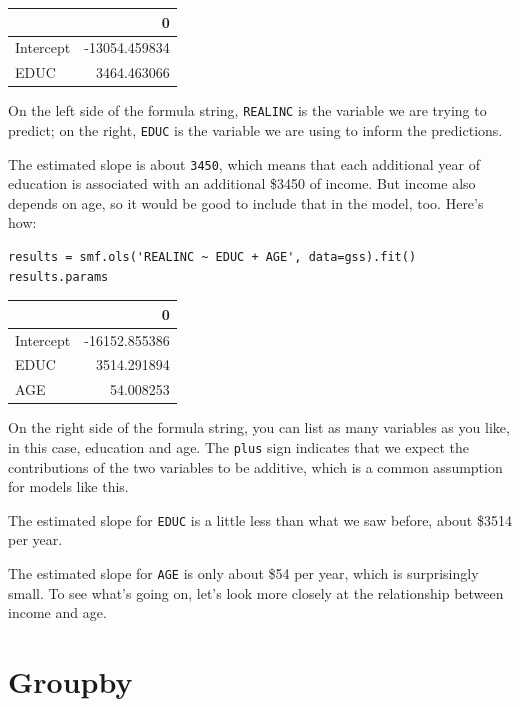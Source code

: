 \begin{tabular}{lr}
\midrule
{} &             0 \\
\midrule
Intercept & -13054.459834 \\
EDUC      &   3464.463066 \\
\midrule
\end{tabular}

On the left side of the formula string,
\passthrough{\lstinline!REALINC!} is the variable we are trying to
predict; on the right, \passthrough{\lstinline!EDUC!} is the variable we
are using to inform the predictions.

The estimated slope is about \passthrough{\lstinline!3450!}, which means
that each additional year of education is associated with an additional
\$3450 of income. But income also depends on age, so it would be good to
include that in the model, too. Here's how:

\begin{lstlisting}[]
results = smf.ols('REALINC ~ EDUC + AGE', data=gss).fit()
results.params
\end{lstlisting}

\begin{tabular}{lr}
\midrule
{} &             0 \\
\midrule
Intercept & -16152.855386 \\
EDUC      &   3514.291894 \\
AGE       &     54.008253 \\
\midrule
\end{tabular}

On the right side of the formula string, you can list as many variables
as you like, in this case, education and age. The
\passthrough{\lstinline!plus!} sign indicates that we expect the
contributions of the two variables to be additive, which is a common
assumption for models like this.

The estimated slope for \passthrough{\lstinline!EDUC!} is a little less
than what we saw before, about \$3514 per year.

The estimated slope for \passthrough{\lstinline!AGE!} is only about \$54
per year, which is surprisingly small. To see what's going on, let's
look more closely at the relationship between income and age.

\hypertarget{groupby}{%
\section{Groupby}\label{groupby}}

